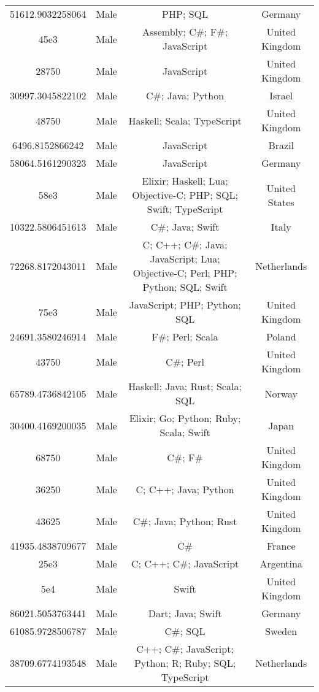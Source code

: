 \begin{center}
\begin{tabular}{ |c|c|c|c| }
51612.9032258064  &  Male  &  PHP; SQL  &  Germany  \\ 
45e3  &  Male  &  Assembly; C\#; F\#; JavaScript  &  United Kingdom  \\ 
28750  &  Male  &  JavaScript  &  United Kingdom  \\ 
30997.3045822102  &  Male  &  C\#; Java; Python  &  Israel  \\ 
48750  &  Male  &  Haskell; Scala; TypeScript  &  United Kingdom  \\ 
6496.8152866242  &  Male  &  JavaScript  &  Brazil  \\ 
58064.5161290323  &  Male  &  JavaScript  &  Germany  \\ 
58e3  &  Male  &  Elixir; Haskell; Lua; Objective-C; PHP; SQL; Swift; TypeScript  &  United States  \\ 
10322.5806451613  &  Male  &  C\#; Java; Swift  &  Italy  \\ 
72268.8172043011  &  Male  &  C; C++; C\#; Java; JavaScript; Lua; Objective-C; Perl; PHP; Python; SQL; Swift  &  Netherlands  \\ 
75e3  &  Male  &  JavaScript; PHP; Python; SQL  &  United Kingdom  \\ 
24691.3580246914  &  Male  &  F\#; Perl; Scala  &  Poland  \\ 
43750  &  Male  &  C\#; Perl  &  United Kingdom  \\ 
65789.4736842105  &  Male  &  Haskell; Java; Rust; Scala; SQL  &  Norway  \\ 
30400.4169200035  &  Male  &  Elixir; Go; Python; Ruby; Scala; Swift  &  Japan  \\ 
68750  &  Male  &  C\#; F\#  &  United Kingdom  \\ 
36250  &  Male  &  C; C++; Java; Python  &  United Kingdom  \\ 
43625  &  Male  &  C\#; Java; Python; Rust  &  United Kingdom  \\ 
41935.4838709677  &  Male  &  C\#  &  France  \\ 
25e3  &  Male  &  C; C++; C\#; JavaScript  &  Argentina  \\ 
5e4  &  Male  &  Swift  &  United Kingdom  \\ 
86021.5053763441  &  Male  &  Dart; Java; Swift  &  Germany  \\ 
61085.9728506787  &  Male  &  C\#; SQL  &  Sweden  \\ 
38709.6774193548  &  Male  &  C++; C\#; JavaScript; Python; R; Ruby; SQL; TypeScript  &  Netherlands  \\ 

\end{tabular}
\end{center}
